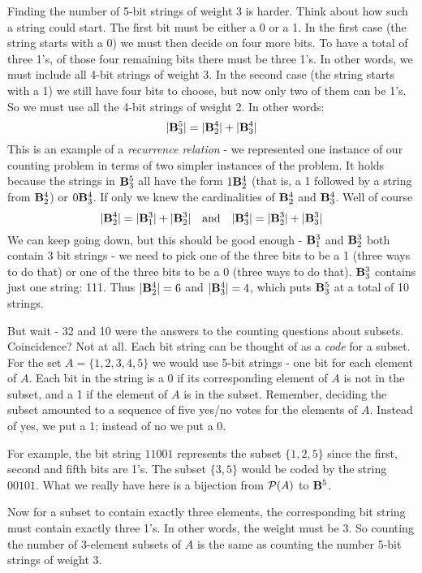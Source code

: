 \documentclass[12pt]{article}
\begin{document}
Finding the number of 5-bit strings of weight 3 is harder.  Think about how such a string could start.  The first bit must be either a 0 or a 1.  In the first case (the string starts with a 0) we must then decide on four more bits.  To have a total of three 1's, of those four remaining bits there must be three 1's.  In other words, we must include all 4-bit strings of weight 3.  In the second case (the string starts with a 1) we still have four bits to choose, but now only two of them can be 1's.  So we must use all the 4-bit strings of weight 2.  In other words:
\[|\mathbf{B}^5_3| = |\mathbf{B}^4_2| + |\mathbf{B}^4_3|\]
This is an example of a {\em recurrence relation} - we represented one instance of our counting problem in terms of two simpler instances of the problem.  It holds because the strings in $\mathbf{B}^5_3$ all have the form $1\mathbf{B}^4_2$ (that is, a 1 followed by a string from $\mathbf{B}^4_2$) or $0\mathbf{B}^4_3$.  If only we knew the cardinalities of $\mathbf{B}^4_2$ and $\mathbf{B}^4_3$.  Well of course
\[|\mathbf{B}^4_2| = |\mathbf{B}^3_1| + |\mathbf{B}^3_2| \quad \mbox{and}\quad |\mathbf{B}^4_3| = |\mathbf{B}^3_2| + |\mathbf{B}^3_3|\]
We can keep going down, but this should be good enough - $\mathbf{B}^3_1$ and $\mathbf{B}^3_2$ both contain 3 bit strings - we need to pick one of the three bits to be a 1 (three ways to do that) or one of the three bits to be a 0 (three ways to do that).  $\mathbf{B}^3_3$ contains just one string: 111.  Thus $|\mathbf{B}^4_2| = 6$ and $|\mathbf{B}^4_3| = 4$, which puts $\mathbf{B}^5_3$ at a total of 10 strings.

But wait - 32 and 10 were the answers to the counting questions about subsets.  Coincidence?  Not at all.  Each bit string can be thought of as a {\em code} for a subset.  For the set $A = \{1,2,3,4,5\}$ we would use 5-bit strings - one bit for each element of $A$.  Each bit in the string is a 0 if its corresponding element of $A$ is not in the subset, and a 1 if the element of $A$ is in the subset.  Remember, deciding the subset amounted to a sequence of five yes/no votes for the elements of $A$.  Instead of yes, we put a 1; instead of no we put a 0.  

For example, the bit string $11001$ represents the subset $\{1,2,5\}$ since the first, second and fifth bits are 1's.  The subset $\{3,5\}$ would be coded by the string $00101$.  What we really have here is a bijection from $\mathcal P(A)$ to $\mathbf{B}^5$.

Now for a subset to contain exactly three elements, the corresponding bit string must contain exactly three 1's.  In other words, the weight must be 3.  So counting the number of 3-element subsets of $A$ is the same as counting the number 5-bit strings of weight 3.
\end{document}
